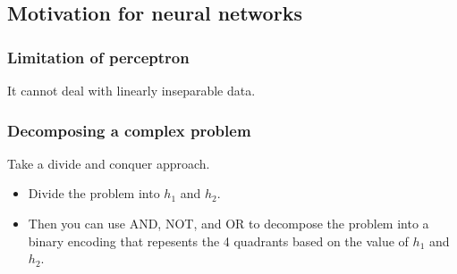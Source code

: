 \subsection{Motivation for neural networks}

\subsubsection{Limitation of perceptron}
\begin{intuition}
    It cannot deal with linearly inseparable data. 
\end{intuition}

\subsubsection{Decomposing a complex problem}
\begin{intuition}
    Take a divide and conquer approach.
    \begin{itemize}
        \item Divide the problem into $h_1$ and $h_2$. 
        \item Then you can use AND, NOT, and OR to decompose the problem into a binary encoding that repesents the 4 quadrants based on the value of $h_1$ and $h_2$. 
    \end{itemize}
\end{intuition}

